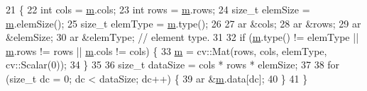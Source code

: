 \begin{DoxyCode}
21                                                                          \{
22   \textcolor{keywordtype}{int} cols = \hyperlink{_gen_blob_8m_ab3cd915d758008bd19d0f2428fbb354a}{m}.cols;
23   \textcolor{keywordtype}{int} rows = \hyperlink{_gen_blob_8m_ab3cd915d758008bd19d0f2428fbb354a}{m}.rows;
24   \textcolor{keywordtype}{size\_t} elemSize = \hyperlink{_gen_blob_8m_ab3cd915d758008bd19d0f2428fbb354a}{m}.elemSize();
25   \textcolor{keywordtype}{size\_t} elemType = \hyperlink{_gen_blob_8m_ab3cd915d758008bd19d0f2428fbb354a}{m}.type();
26 
27   ar &cols;
28   ar &rows;
29   ar &elemSize;
30   ar &elemType; \textcolor{comment}{// element type.}
31 
32   \textcolor{keywordflow}{if} (\hyperlink{_gen_blob_8m_ab3cd915d758008bd19d0f2428fbb354a}{m}.type() != elemType || \hyperlink{_gen_blob_8m_ab3cd915d758008bd19d0f2428fbb354a}{m}.rows != rows || \hyperlink{_gen_blob_8m_ab3cd915d758008bd19d0f2428fbb354a}{m}.cols != cols) \{
33     \hyperlink{_gen_blob_8m_ab3cd915d758008bd19d0f2428fbb354a}{m} = cv::Mat(rows, cols, elemType, cv::Scalar(0));
34   \}
35 
36   \textcolor{keywordtype}{size\_t} dataSize = cols * rows * elemSize;
37 
38   \textcolor{keywordflow}{for} (\textcolor{keywordtype}{size\_t} dc = 0; dc < dataSize; dc++) \{
39     ar &\hyperlink{_gen_blob_8m_ab3cd915d758008bd19d0f2428fbb354a}{m}.data[dc];
40   \}
41 \}
\end{DoxyCode}
